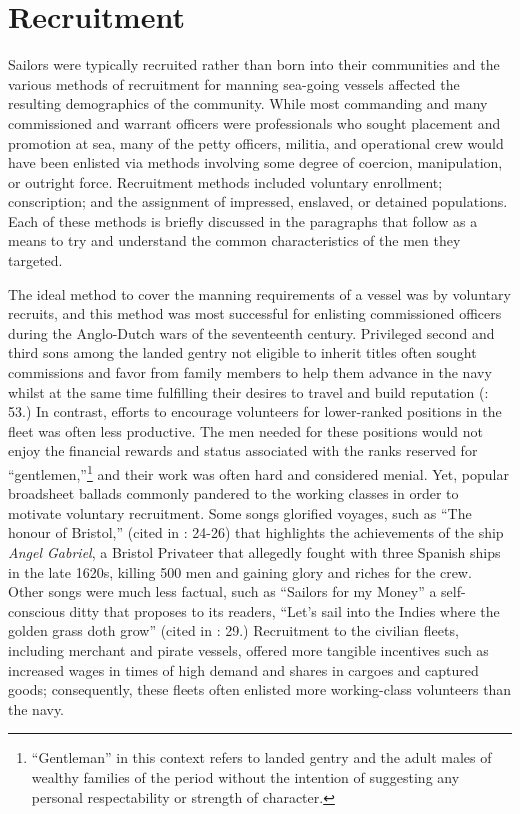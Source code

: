 \section{{Recruitment}}%

  Sailors were typically recruited rather than born into their communities and the various methods of recruitment for manning sea-going vessels affected the resulting demographics of the community. While most commanding and many commissioned and warrant officers were professionals who sought placement and promotion at sea, many of the petty officers, militia, and operational crew would have been enlisted via methods involving some degree of coercion, manipulation, or outright force. Recruitment methods included voluntary enrollment; conscription; and the assignment of impressed, enslaved, or detained populations. Each of these methods is briefly discussed in the paragraphs that follow as a means to try and understand the common characteristics of the men they targeted. 

  The ideal method to cover the manning requirements of a vessel was by voluntary recruits, and this method was most successful for enlisting commissioned officers during the Anglo-Dutch wars of the seventeenth century. Privileged second and third sons among the landed gentry not eligible to inherit titles often sought commissions and favor from family members to help them advance in the navy whilst at the same time fulfilling their desires to travel and build reputation (\citealt{Brown2011}: 53.) In contrast, efforts to encourage volunteers for lower-ranked positions in the fleet was often less productive. The men needed for these positions would not enjoy the financial rewards and status associated with the ranks reserved for “gentlemen,”\footnote{“Gentleman” in this context refers to landed gentry and the adult males of wealthy families of the period without the intention of suggesting any personal respectability or strength of character.}  and their work was often hard and considered menial. Yet, popular broadsheet ballads commonly pandered to the working classes in order to motivate voluntary recruitment. Some songs glorified voyages, such as “The honour of Bristol,” (cited in \citealt{Palmer1986}: 24-26) that highlights the achievements of the ship \textit{Angel Gabriel}, a Bristol Privateer that allegedly fought with three Spanish ships in the late 1620s, killing 500 men and gaining glory and riches for the crew. Other songs were much less factual, such as “Sailors for my Money” a self-conscious ditty that proposes to its readers, “Let’s sail into the Indies where the golden grass doth grow” (cited in \citealt{Palmer1986}: 29.) Recruitment to the civilian fleets, including merchant and pirate vessels, offered more tangible incentives such as increased wages in times of high demand and shares in cargoes and captured goods; consequently, these fleets often enlisted more working-class volunteers than the navy. 

